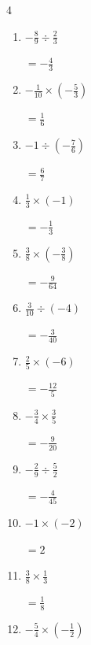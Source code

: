 \begin{multicols}{4}
\begin{enumerate}
  \item $\displaystyle -\frac{8}{9}\div{}\frac{2}{3}$

        $\displaystyle =-\frac{4}{3}$

  \item $\displaystyle -\frac{1}{10}\times{}\left(-\frac{5}{3}\right)$

        $\displaystyle =\frac{1}{6}$

  \item $\displaystyle -1\div{}\left(-\frac{7}{6}\right)$

        $\displaystyle =\frac{6}{7}$

  \item $\displaystyle \frac{1}{3}\times{}\left(-1\right)$

        $\displaystyle =-\frac{1}{3}$

  \item $\displaystyle \frac{3}{8}\times{}\left(-\frac{3}{8}\right)$

        $\displaystyle =-\frac{9}{64}$

\columnbreak %

  \item $\displaystyle \frac{3}{10}\div{}\left(-4\right)$

        $\displaystyle =-\frac{3}{40}$

  \item $\displaystyle \frac{2}{5}\times{}\left(-6\right)$

        $\displaystyle =-\frac{12}{5}$

  \item $\displaystyle -\frac{3}{4}\times{}\frac{3}{5}$

        $\displaystyle =-\frac{9}{20}$

  \item $\displaystyle -\frac{2}{9}\div{}\frac{5}{2}$

        $\displaystyle =-\frac{4}{45}$

  \item $\displaystyle -1\times{}\left(-2\right)$

        $\displaystyle =2$

  \item $\displaystyle \frac{3}{8}\times{}\frac{1}{3}$

        $\displaystyle =\frac{1}{8}$

  \item $\displaystyle -\frac{5}{4}\times{}\left(-\frac{1}{2}\right)$


\end{enumerate}
\end{multicols}
